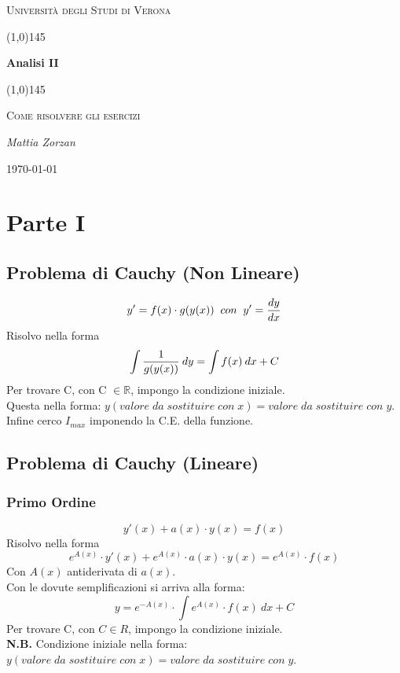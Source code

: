 \documentclass[a4paper, 10pt]{article}
\begin{document}
	 \clearpage
	\begin{titlepage}
		\centering
		\vspace*{\fill}
		{\scshape\LARGE Università degli Studi di Verona \par}
		\vspace{1.5cm}
		\line(1,0){145} \\
		{\huge\bfseries Analisi II\par}
		\line(1,0){145} \\
		\vspace{0.5cm}
		{\scshape\Large Come risolvere gli esercizi\par}
		\vspace{2cm}
		{\Large\itshape Mattia Zorzan\par}
		\vspace{1cm}
		
		\vspace{5cm}
		\vspace*{\fill}
		{\large \today\par}
	\end{titlepage}
	\thispagestyle{empty}
	
	\tableofcontents
	
	\newpage

	\section{Parte I}
		\subsection{Problema di Cauchy (Non Lineare)}
				\[
					y' = f(x) \cdot g(y(x))  
					\;\;con\;\; 
					y' = {dy \over dx}
				\]
			Risolvo nella forma
				\[
					\int {1 \over g(y(x))}\:dy = \int f(x)\:dx + C
				\]
			Per trovare C, con C $ \in \mathbb{R} $, impongo la condizione iniziale.\\
			Questa nella forma: $ y(valore\;da\;sostituire\;con\;x) = valore\;da\;sostituire\;con\;y $.\\
			Infine cerco $ I_{max} $ imponendo la C.E. della funzione.
			
		\subsection{Problema di Cauchy (Lineare)}
			\subsubsection{Primo Ordine}
					\[
						y'(x) + a(x) \cdot y(x) = f(x)
					\]
				Risolvo nella forma
					\[
						\mathit{e}^{A(x)} \cdot y'(x) + \mathit{e}^{A(x)} \cdot a(x) \cdot y(x) = \mathit{e}^{A(x)} \cdot f(x)
					\]
				Con $ A(x) $ antiderivata di $ a(x) $.\\
				Con le dovute semplificazioni si arriva alla forma:
					\[
						y = \mathit{e}^{-A(x)} \cdot \int \mathit{e}^{A(x)} \cdot f(x)\:dx + C
					\]	
				Per trovare C, con $ C \in R $, impongo la condizione iniziale.\\
				\textbf{N.B.} Condizione iniziale nella forma: $ y(valore\;da\;sostituire\;con\;x) = valore\;da\;sostituire\;con\;y $.
				
\end{document}
